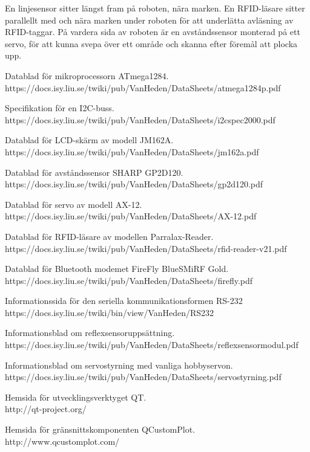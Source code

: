\documentclass[a4paper,12pt]{article}
\begin{document}
En linjesensor sitter längst fram på roboten, nära marken. En RFID-läsare sitter parallellt med och nära marken under roboten för att underlätta avläsning av RFID-taggar. På vardera sida av roboten är en avståndssensor monterad på ett servo, för att kunna svepa över ett område och skanna efter föremål att plocka upp.









\newpage
\begin{thebibliography}{9}
 Datablad för mikroprocessorn ATmega1284.
\\https://docs.isy.liu.se/twiki/pub/VanHeden/DataSheets/atmega1284p.pdf

 Specifikation för en I2C-buss.
\\ https://docs.isy.liu.se/twiki/pub/VanHeden/DataSheets/i2cspec2000.pdf

 Datablad för LCD-skärm av modell JM162A. 
\\https://docs.isy.liu.se/twiki/pub/VanHeden/DataSheets/jm162a.pdf

 Datablad för avståndssensor SHARP GP2D120.
\\ https://docs.isy.liu.se/twiki/pub/VanHeden/DataSheets/gp2d120.pdf

 Datablad för servo av modell AX-12.
\\ https://docs.isy.liu.se/twiki/pub/VanHeden/DataSheets/AX-12.pdf

 Datablad för RFID-läsare av modellen Parralax-Reader.
\\ https://docs.isy.liu.se/twiki/pub/VanHeden/DataSheets/rfid-reader-v21.pdf

 Datablad för Bluetooth modemet FireFly BlueSMiRF Gold.
\\https://docs.isy.liu.se/twiki/pub/VanHeden/DataSheets/firefly.pdf

 Informationssida för den seriella kommunikationsformen RS-232
\\https://docs.isy.liu.se/twiki/bin/view/VanHeden/RS232

 Informationsblad om reflexsensoruppsättning.
\\https://docs.isy.liu.se/twiki/pub/VanHeden/DataSheets/reflexsensormodul.pdf

 Informationsblad om servostyrning med vanliga hobbyservon.
\\https://docs.isy.liu.se/twiki/pub/VanHeden/DataSheets/servostyrning.pdf

 Hemsida för utvecklingsverktyget QT.
\\http://qt-project.org/

 Hemsida för gränsnittskomponenten QCustomPlot.
\\http://www.qcustomplot.com/

\end{thebibliography}

\newpage
\appendix

\end{document}
